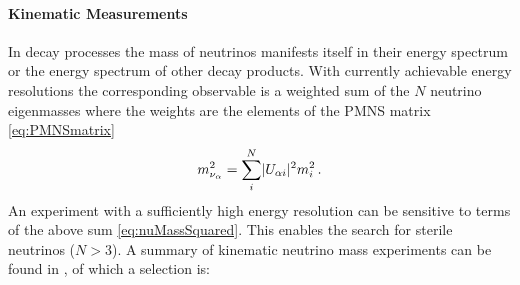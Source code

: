 \paragraph{Kinematic Measurements}
In decay processes the mass of neutrinos manifests itself in their energy spectrum or the energy spectrum of other decay products. With currently achievable energy resolutions the corresponding observable is a weighted sum of the $N$ neutrino eigenmasses where the weights are the elements of the PMNS matrix \eqref{eq:PMNSmatrix} 
\begin{equation}
\label{eq:nuMassSquared}
    m^2_{\nu_{\alpha}} = \sum_{i}^{N}\lvert U_{\alpha i}\rvert^2 m_i^2 \text{\,.}
\end{equation}
An experiment with a sufficiently high energy resolution can be sensitive to terms of the above sum \eqref{eq:nuMassSquared}. This enables the search for sterile neutrinos ($N>3$). A summary of kinematic neutrino mass experiments can be found in \cite{Otten:2008zz, SeitzM2019, zuber2011neutrino}, of which a selection is:
